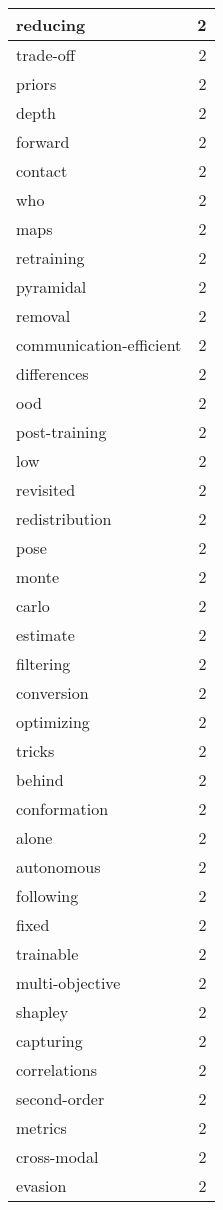 \begin{table}[h]
\begin{tabular}{|l|r|}
\hline
reducing & 2 \\
\hline
trade-off & 2 \\
\hline
priors & 2 \\
\hline
depth & 2 \\
\hline
forward & 2 \\
\hline
contact & 2 \\
\hline
who & 2 \\
\hline
maps & 2 \\
\hline
retraining & 2 \\
\hline
pyramidal & 2 \\
\hline
removal & 2 \\
\hline
communication-efficient & 2 \\
\hline
differences & 2 \\
\hline
ood & 2 \\
\hline
post-training & 2 \\
\hline
low & 2 \\
\hline
revisited & 2 \\
\hline
redistribution & 2 \\
\hline
pose & 2 \\
\hline
monte & 2 \\
\hline
carlo & 2 \\
\hline
estimate & 2 \\
\hline
filtering & 2 \\
\hline
conversion & 2 \\
\hline
optimizing & 2 \\
\hline
tricks & 2 \\
\hline
behind & 2 \\
\hline
conformation & 2 \\
\hline
alone & 2 \\
\hline
autonomous & 2 \\
\hline
following & 2 \\
\hline
fixed & 2 \\
\hline
trainable & 2 \\
\hline
multi-objective & 2 \\
\hline
shapley & 2 \\
\hline
capturing & 2 \\
\hline
correlations & 2 \\
\hline
second-order & 2 \\
\hline
metrics & 2 \\
\hline
cross-modal & 2 \\
\hline
evasion & 2 \\
\hline

\end{tabular}
\end{table}

